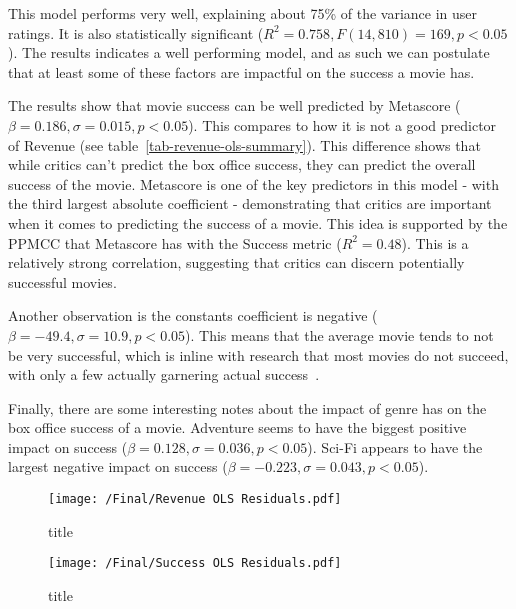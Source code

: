         \begin{multicols}{2}
            This model performs very well, explaining about 75\% of the variance in user
                ratings.
            It is also statistically significant ($R^2=0.758, F(14,810)=169, p<0.05$).
            The results indicates a well performing model, and as such we can postulate
                that at least some of these factors are impactful on the success a movie has.

            The results show that movie success can be well predicted by Metascore
                ($\beta=0.186, \sigma=0.015, p<0.05$).
            This compares to how it is not a good predictor of Revenue (see
                table~\ref{tab-revenue-ols-summary}).
            This difference shows that while critics can't predict the box office success,
                they can predict the overall success of the movie.
            Metascore is one of the key predictors in this model - with the third largest
                absolute coefficient - demonstrating that critics are important when it comes
                to predicting the success of a movie.
            This idea is supported by the PPMCC that Metascore has with the Success metric
                ($R^2=0.48$).
            This is a relatively strong correlation, suggesting that critics can discern
                potentially successful movies.

            Another observation is the constants coefficient is negative
                ($\beta=-49.4,\sigma=10.9,p<0.05$).
            This means that the average movie tends to not be very successful, which is
                inline with research that most movies do not succeed, with only a few actually
                garnering actual success~\cite{walls2005modelling}.

            Finally, there are some interesting notes about the impact of genre has on the
                box office success of a movie.
            Adventure seems to have the biggest positive impact on success
                ($\beta=0.128,\sigma=0.036,p<0.05$).
            Sci-Fi appears to have the largest negative impact on success
                ($\beta=-0.223,\sigma=0.043,p<0.05$).

            \begin{figure}[H]
                \texttt{[image: /Final/Revenue OLS Residuals.pdf]}
                \caption[short]{title}\label{fig-revenue-ols-residuals}
            \end{figure}

            \begin{figure}[H]
                \texttt{[image: /Final/Success OLS Residuals.pdf]}
                \caption[short]{title}\label{fig-success-ols-residuals}

            \end{figure}

        \end{multicols}
